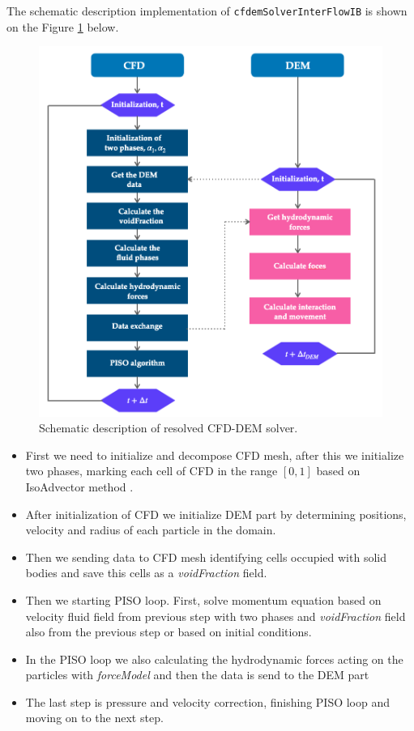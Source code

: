 The schematic description implementation of  \verb|cfdemSolverInterFlowIB| is shown on the Figure \ref{fig:cfddemSolver} below. 
\begin{figure}[!ht]
    \centering
    \includegraphics[width=17cm]{Images/chap3/CFD-DEM_scheme.png}
    \caption{Schematic description of resolved CFD-DEM solver.}
    \label{fig:cfddemSolver}
\end{figure}
\begin{itemize}
    \item First we need to initialize and decompose CFD mesh, after this  we initialize two phases, marking each cell of CFD in the range $[0,1]$ based on IsoAdvector method \cite{roenby2019isoadvector}.
    \item  After initialization of CFD we initialize DEM part by determining positions, velocity and radius of each particle in the domain.
    \item Then we sending data to CFD mesh identifying cells occupied with solid bodies and save this cells as a \textit{voidFraction} field. 
    \item Then we starting PISO loop. First, solve momentum equation based on velocity fluid field from previous step with two phases and \textit{voidFraction} field also from the previous step or based on initial conditions.
    \item In the PISO loop we also calculating the hydrodynamic forces acting on the particles with \textit{forceModel} and then the data is send to the DEM part
    \item The last step is pressure and velocity correction, finishing PISO loop and moving on to the next step.
\end{itemize}

